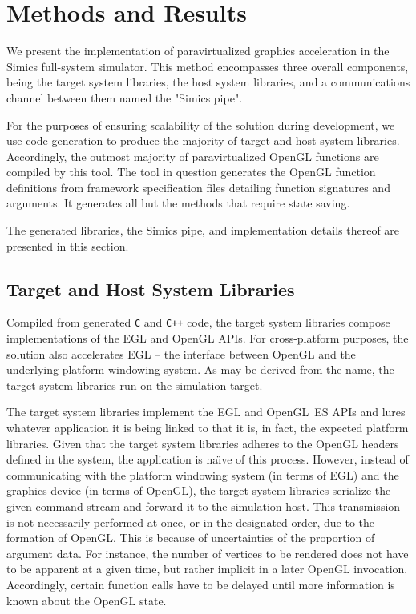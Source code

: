 
\section{Methods and Results}
\label{sec:methodsandresults}
We present the implementation of paravirtualized graphics acceleration in the Simics full-system simulator.
This method encompasses three overall components, being the target system libraries, the host system libraries, and a communications channel between them named the "Simics pipe".

For the purposes of ensuring scalability of the solution during development, we use code generation to produce the majority of target and host system libraries.
Accordingly, the outmost majority of paravirtualized OpenGL functions are compiled by this tool.
The tool in question generates the OpenGL function definitions from framework specification files detailing function signatures and arguments.
It generates all but the methods that require state saving.

The generated libraries, the Simics pipe, and implementation details thereof are presented in this section.

\subsection{Target and Host System Libraries}
\label{sec:proposedsolutionandimplementation_targetandhostsystemlibraries}
Compiled from generated \texttt{C} and \texttt{C++} code, the target system libraries compose implementations of the EGL and OpenGL APIs.
For cross-platform purposes, the solution also accelerates EGL -- the interface between OpenGL and the underlying platform windowing system.
As may be derived from the name, the target system libraries run on the simulation target.

The target system libraries implement the EGL and OpenGL~ES APIs and lures whatever application it is being linked to that it is, in fact, the expected platform libraries.
Given that the target system libraries adheres to the OpenGL headers defined in the system, the application is na\"{\i}ve of this process.
However, instead of communicating with the platform windowing system (in terms of EGL) and the graphics device (in terms of OpenGL), the target system libraries serialize the given command stream and forward it to the simulation host.
This transmission is not necessarily performed at once, or in the designated order, due to the formation of OpenGL.
This is because of uncertainties of the proportion of argument data.
For instance, the number of vertices to be rendered does not have to be apparent at a given time, but rather implicit in a later OpenGL invocation.
Accordingly, certain function calls have to be delayed until more information is known about the OpenGL state.

